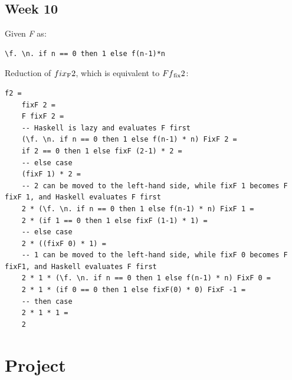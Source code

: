 \documentclass{article}
\theoremstyle{theorem}
\theoremstyle{definition}
\theoremstyle{remark}
\begin{document}
\subsection{Week 10}
Given \textit{F} as:
\begin{lstlisting}
\f. \n. if n == 0 then 1 else f(n-1)*n
\end{lstlisting}
Reduction of $fix\textsubscript{F}2$, which is equivalent to $Ff\textsubscript{fix}2$:
\begin{lstlisting}
f2 =
    fixF 2 =
    F fixF 2 =
    -- Haskell is lazy and evaluates F first
    (\f. \n. if n == 0 then 1 else f(n-1) * n) FixF 2 =
    if 2 == 0 then 1 else fixF (2-1) * 2 =
    -- else case
    (fixF 1) * 2 =
    -- 2 can be moved to the left-hand side, while fixF 1 becomes F fixF 1, and Haskell evaluates F first
    2 * (\f. \n. if n == 0 then 1 else f(n-1) * n) FixF 1 =
    2 * (if 1 == 0 then 1 else fixF (1-1) * 1) =
    -- else case
    2 * ((fixF 0) * 1) =
    -- 1 can be moved to the left-hand side, while fixF 0 becomes F fixF1, and Haskell evaluates F first
    2 * 1 * (\f. \n. if n == 0 then 1 else f(n-1) * n) FixF 0 =
    2 * 1 * (if 0 == 0 then 1 else fixF(0) * 0) FixF -1 =
    -- then case
    2 * 1 * 1 =
    2
\end{lstlisting}

\section{Project}\label{Project}
\end{document}
